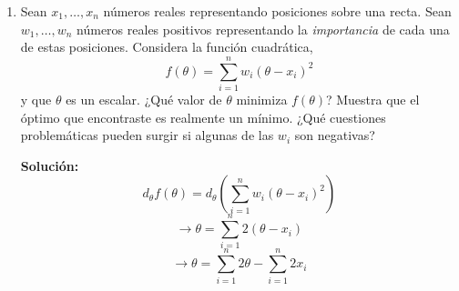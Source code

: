 \documentclass[11pt,letterpaper]{article}
\newenvironment{solution}{%
  \noindent\begin{shaded}
  \textbf{Solución:}\ }{
  \end{shaded}%
}
\begin{document}
\begin{enumerate}
\item%
  Sean \(x_1,\dots,x_n\) números reales representando posiciones sobre
  una recta.  Sean \(w_1,\dots,w_n\) números reales positivos
  representando la \emph{importancia} de cada una de estas
  posiciones. Considera la función cuadrática,
  \[ f(\theta) = \sum_{i=1}^n w_i\left(\theta-x_i\right)^2 \]
  y que \(\theta\) es un escalar. ¿Qué valor de \(\theta\) minimiza
  \(f(\theta)\)? Muestra que el óptimo que encontraste es realmente un
  mínimo. ¿Qué cuestiones problemáticas pueden surgir si algunas de
  las \(w_i\) son negativas?
  \begin{solution}
    \[
    d_\theta f\left(\theta\right) = d_\theta ( \sum_{i=1}^n w_i (\theta-x_i)^2)\]
    \[ \longrightarrow \theta = \sum_{i=1}^n 2(\theta - x_i)\] 
    \[ \longrightarrow \theta = \sum_{i=1}^n 2\theta - \sum_{i=1}^n 2x_i\]
    

\end{solution}
\end{enumerate}
\end{document}
